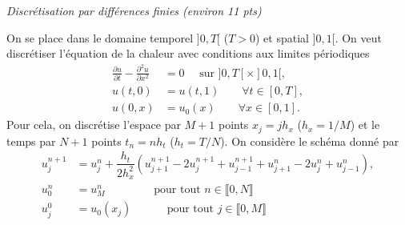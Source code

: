 \documentclass[12pt]{article}
\begin{document}
\newpage
\begin{exo}
  \textit{Discr\'etisation par diff\'erences finies (environ 11 pts)}

  On se place dans le domaine temporel $]0,T[$ ($T > 0$) et spatial $]0,1[$.
  On veut discr\'etiser l'\'equation de la chaleur avec conditions aux limites p\'eriodiques
  \begin{align*}
    \frac{\partial u}{\partial t} - \frac{\partial^2 u}{\partial x^2}
    &= 0 \quad \text{ sur } ]0,T[ \times ]0,1[ ,
    \\
    u(t,0)
    &= u(t,1) \qquad \forall t \in [0,T] ,
    \\
    u(0,x)
    &= u_0(x) \qquad \forall x \in [0,1] .
  \end{align*}
  Pour cela, on discr\'etise l'espace par $M+1$ points $x_j = jh_x$ ($h_x = 1/M$)
  et le temps par $N+1$ points $t_n = n h_t$ ($h_t = T/N$).
  On consid\`ere le sch\'ema donn\'e par
  \begin{align*}
    u_{j}^{n+1}
    &= u_j^n + \dfrac{h_t}{2 h_x^2} ( u_{j+1}^{n+1} - 2 u_{j}^{n+1} + u_{j-1}^{n+1} + u_{j+1}^{n} - 2 u_{j}^n + u_{j-1}^{n} ) ,
    \\
    u_0^n
    &= u_M^n \qquad \qquad \text{ pour tout } n \in \llbracket 0, N \rrbracket
    \\
    u_j^0
    &= u_0(x_j) \qquad \;\;\;\! \text{ pour tout } j \in \llbracket 0,M \rrbracket
  \end{align*}


\end{exo}
\end{document}
